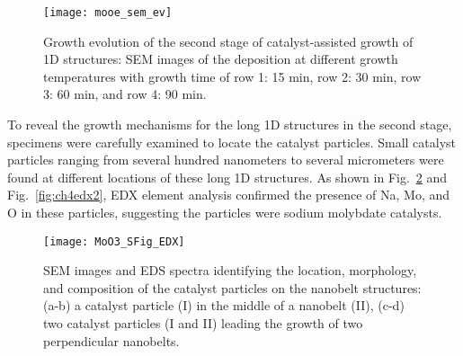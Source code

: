 \begin{figure}[htb]
\centering
\texttt{[image: mooe\_sem\_ev]}
\caption[Growth evolution of the second stage of catalyst-assisted growth of  1D structures]{Growth evolution of the second stage of catalyst-assisted growth of  1D structures: SEM images of the deposition at different growth temperatures with growth time of row 1: 15 min, row 2: 30 min, row 3: 60 min, and row 4: 90 min.}
\label{fig:ch4ev}
\end{figure}
To reveal the growth mechanisms for the long 1D structures in the second stage, specimens were carefully examined to locate the catalyst particles. Small catalyst particles ranging from several hundred nanometers to several micrometers were found at different locations of these long 1D structures. As shown in Fig.~\ref{fig:ch4edx1} and Fig.~\ref{fig:ch4edx2}, EDX element analysis confirmed the presence of Na, Mo, and O in these particles, suggesting the particles were sodium molybdate catalysts.  

\begin{figure}[htb]
\centering
\texttt{[image: MoO3\_SFig\_EDX]}
\caption[SEM images and EDS spectra identifying the location, morphology, and composition of the catalyst particles on the nanobelt structures]{SEM images and EDS spectra identifying the location, morphology, and composition of the catalyst particles on the nanobelt structures: (a-b) a catalyst particle (I) in the middle of a nanobelt (II), (c-d) two catalyst particles (I and II) leading the growth of two perpendicular nanobelts.}
\label{fig:ch4edx1}
\end{figure}

